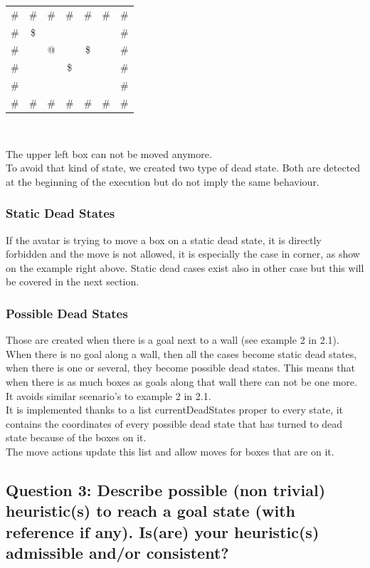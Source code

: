 \documentclass[a4paper,10pt]{article}
\begin{document}
	\begin{center}
	\begin{tabular}{ccccccc}
		\# & \# & \# & \# & \# & \# & \# \\ 
		\# & \$ &    &    &    &    & \# \\ 
		\# &    & @  &    & \$ &    & \# \\ 
		\# &    &    & \$ &    &    & \# \\ 
		\# &    &    &    &    &    & \# \\
		\# & \# & \# & \# & \# & \# & \# \\ 
	\end{tabular}\\ 
	\end{center}

	
		The upper left box can not be moved anymore.\\
			To avoid that kind of state, we created two type of dead state. Both are detected at the beginning of the execution but do not imply the same behaviour.
			
			\subsubsection{Static Dead States}
				If the avatar is trying to move a box on a static dead state, it is directly forbidden and the move is not allowed, it is especially the case in corner, as show on the example right above.
				Static dead cases exist also in other case but this will be covered in the next section.
				
			\subsubsection{Possible Dead States}
				Those are created when there is a goal next to a wall (see example 2 in 2.1). When there is no goal along a wall, then all the cases become static dead states, when there is one or several, they become possible dead states. This means that when there is as much boxes as goals along that wall there can not be one more. It avoids similar scenario's to example 2 in 2.1.\\
				It is implemented thanks to a list currentDeadStates proper to every state, it contains the coordinates of every possible dead state that has turned to dead state because of the boxes on it.\\
				The move actions update this list and allow moves for boxes that are on it.				
				
		\subsection{Question 3: Describe possible (non trivial) heuristic(s) to reach a goal state (with reference if any). Is(are) your heuristic(s) admissible and/or consistent?}
\end{document}
